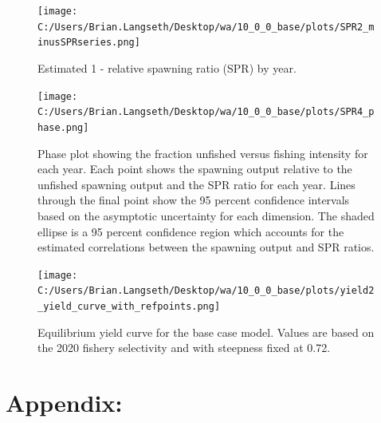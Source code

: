 \documentclass[11pt,
  english,
  letterpaper,
]{article}
\begin{document}
\tagmcend\tagstructend


\begin{figure}
\centering
\texttt{[image: C:/Users/Brian.Langseth/Desktop/wa/10\_0\_0\_base/plots/SPR2\_minusSPRseries.png]}
\caption{Estimated 1 - relative spawning ratio (SPR) by year.\label{fig:1-spr}}
\end{figure}

\tagmcend\tagstructend


\begin{figure}
\centering
\texttt{[image: C:/Users/Brian.Langseth/Desktop/wa/10\_0\_0\_base/plots/SPR4\_phase.png]}
\caption{Phase plot showing the fraction unfished versus fishing intensity for each year. Each point shows the spawning output relative to the unfished spawning output and the SPR ratio for each year. Lines through the final point show the 95 percent confidence intervals based on the asymptotic uncertainty for each dimension. The shaded ellipse is a 95 percent confidence region which accounts for the estimated correlations between the spawning output and SPR ratios.\label{fig:phase-plot}}
\end{figure}

\tagmcend\tagstructend


\begin{figure}
\centering
\texttt{[image: C:/Users/Brian.Langseth/Desktop/wa/10\_0\_0\_base/plots/yield2\_yield\_curve\_with\_refpoints.png]}
\caption{Equilibrium yield curve for the base case model. Values are based on the 2020 fishery selectivity and with steepness fixed at 0.72.\label{fig:yield}}
\end{figure}

\tagmcend\tagstructend

\newpage

\clearpage


\hypertarget{appendix}{%
\section{Appendix:}\label{appendix}}

\leavevmode\tagmcend\tagstructend
\end{document}
